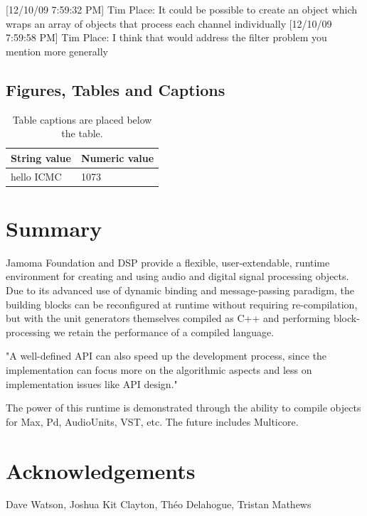 \documentclass[twoside,10pt]{article}
\begin{document}
[12/10/09 7:59:32 PM] Tim Place: It could be possible to create an object which wraps an array of objects that process each channel individually
[12/10/09 7:59:58 PM] Tim Place: I think that would address the filter problem you mention more generally


\subsection{Figures, Tables and Captions}

\begin{table}[htbp]
\begin{center}
\begin{tabular}{|l|l|}
\hline
String value & Numeric value \\
\hline
hello ICMC  & 1073 \\
\hline
\end{tabular}
\end{center}
\caption{Table captions are placed below the table.}
\label{tab:example}
\end{table}




\section{Summary} %

Jamoma Foundation and DSP provide a flexible, user-extendable, runtime environment for creating and using audio and digital signal processing objects.  Due to its advanced use of dynamic binding and message-passing paradigm, the building blocks can be reconfigured at runtime without requiring re-compilation, but with the unit generators themselves compiled as C++ and performing block-processing we retain the performance of a compiled language.


"A well-defined API can also speed up the development process, since the implementation can focus more on the algorithmic aspects and less on implementation issues like API design." \cite{Lerch:2005}

The power of this runtime is demonstrated through the ability to compile objects for Max, Pd, AudioUnits, VST, etc.  The future includes Multicore.






\section{Acknowledgements} %

Dave Watson, Joshua Kit Clayton, Théo Delahogue, Tristan Mathews




\end{document}
